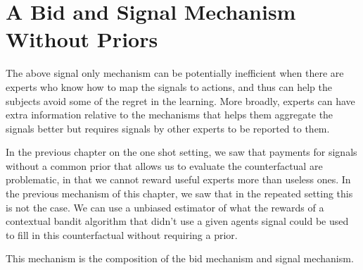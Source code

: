 \section{A Bid and Signal Mechanism Without Priors}



The above signal only mechanism can be potentially inefficient when there are experts who know how to map the signals to actions, and thus can help the subjects avoid some of the regret in the learning.
More broadly, experts can have extra information relative to the mechanisms that helps them aggregate the signals better but requires signals by other experts to be reported to them. 

In the previous chapter on the one shot setting, we saw that payments for  signals without a common prior that allows us to evaluate the counterfactual are problematic, in that we cannot reward useful experts more than useless ones. In the previous mechanism of this chapter, we saw that in the repeated setting this is not the case. We can use a unbiased estimator of what the rewards of a contextual bandit algorithm that didn't use a given agents signal could be used to fill in this counterfactual without requiring a prior.

This mechanism is the composition of the bid mechanism and signal mechanism.


